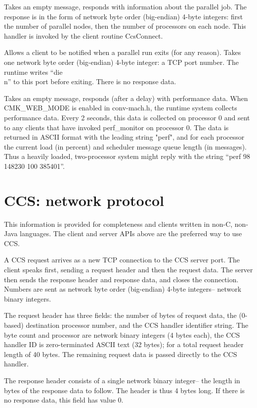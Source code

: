 Takes an empty message, responds with information about the parallel
job.  The response is in the form of network byte order (big-endian) 4-byte 
integers: first the number of parallel nodes, then the number of processors
on each node.  This handler is invoked by the client routine CcsConnect.

Allows a client to be notified when a parallel run exits (for any reason).
Takes one network byte order (big-endian) 4-byte integer: a TCP port
number. The runtime writes ``die\\n'' to this port before exiting.
There is no response data.

Takes an empty message, responds (after a delay) with performance data.
When CMK\_WEB\_MODE is enabled in conv-mach.h, the runtime system collects
performance data.  Every 2 seconds, this data is collected on processor
0 and sent to any clients that have invoked perf\_monitor on processor 0.
The data is returned in ASCII format with the leading string "perf", 
and for each processor the current load (in percent) and scheduler message
queue length (in messages).  Thus a heavily loaded, two-processor system
might reply with the string ``perf 98 148230 100 385401''.


\section{CCS: network protocol}
This information is provided for completeness and clients written
in non-C, non-Java languages.  The client and server APIs above are
the preferred way to use CCS.

A CCS request arrives as a new TCP connection to the CCS server port.
The client speaks first, sending a request header and then the request
data.  The server then sends the response header and response data,
and closes the connection.  Numbers are sent as network byte order
(big-endian) 4-byte integers-- network binary integers.

The request header has three fields: the number of bytes of request data,
the (0-based) destination processor number, and the CCS handler identifier
string.  The byte count and processor are network binary integers (4 bytes
each), the CCS handler ID is zero-terminated ASCII text (32 bytes); for
a total request header length of 40 bytes.  The remaining request data
is passed directly to the CCS handler.

The response header consists of a single network binary integer-- the 
length in bytes of the response data to follow.  The header is thus 4 
bytes long.  If there is no response data, this field has value 0.

